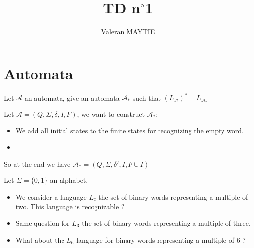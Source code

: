 \documentclass{article}
\title{TD n$^\circ$1}
\author{Valeran MAYTIE}
\date{}
\theoremstyle{plain}
\begin{document}
  \maketitle

  \section{Automata}

  \exercice Let $\mathcal A$ an automata, give an automata $\mathcal A_*$ such
    that $(L_{\mathcal A})^* = L_{\mathcal A_*}$

  \begin{correction}{}{}
    Let $\mathcal A = (Q, \Sigma, \delta, I, F)$, we want to construct $\mathcal
    A_*$:

    \begin{itemize}
      \item We add all initial states to the finite states for recognizing
        the empty word.

      \item
    \end{itemize}

    So at the end we have $\mathcal A_* = (Q, \Sigma, \delta', I, F \cup I)$
  \end{correction}

  \exercice \;

  \begin{correction}{}{}
  \end{correction}

  \exercice \;

  \begin{correction}{}{}
  \end{correction}

  \exercice \;

  \begin{correction}{}{}
  \end{correction}

  \exercice \;

  \begin{correction}{}{}
  \end{correction}

  \exercice Let $\Sigma = \{0, 1\}$ an alphabet.

    \begin{itemize}
      \item We consider a language $L_2$ the set of binary words representing a
        multiple of two. This language is recognizable ?

      \item Same question for $L_3$ the set of binary words representing a
        multiple of three.

      \item What about the $L_6$ language for binary words representing a
        multiple of 6 ?
    \end{itemize}
\end{document}
